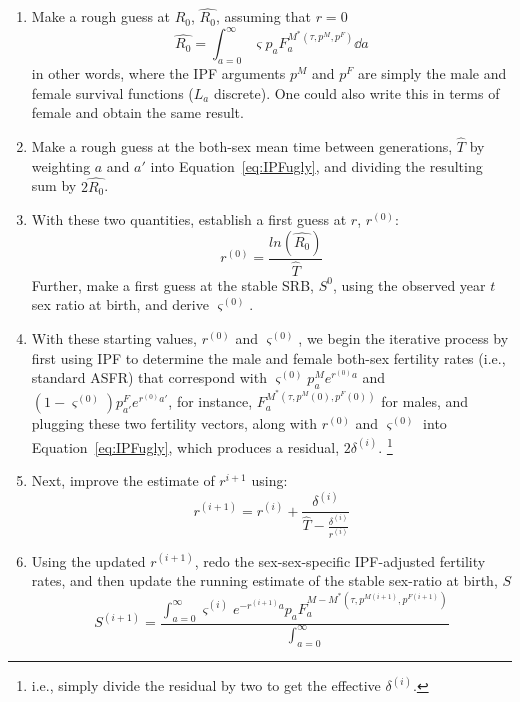 \begin{enumerate}
  \item Make a rough guess at $R_0$, $\widehat{R_0}$, assuming that $r = 0$
  \begin{equation}
  \widehat{R_0} = \int_{a=0}^\infty \varsigma p_aF_a^{M^\ast(\tau,p^{M},
  p^{F})} \dd a
  \end{equation}
  in other words, where the IPF arguments $p^{M}$ and $p^{F}$ are simply the
  male and female survival functions ($L_a$ discrete). One could also write this
  in terms of female and obtain the same result.
  \item Make a rough guess at the both-sex mean time between generations,
  $\widehat{T}$ by weighting $a$ and $a'$ into Equation~\eqref{eq:IPFugly},
  and dividing the resulting sum by $2\widehat{R_0}$.
  \item With these two quantities, establish a first guess at $r$,
  $r^{(0)}$:
  \begin{equation}
  r^{(0)} = \frac{ln(\widehat{R_0})}{\widehat{T}}
  \end{equation}
  Further, make a first guess at the stable SRB, $S^0$, using
  the observed year $t$ sex ratio at birth, and derive $\varsigma^{(0)}$.
  \item With these starting values, $r^{(0)}$ and $\varsigma^{(0)}$, we begin
  the iterative process by first using IPF to determine the male and female
  both-sex fertility rates (i.e., standard ASFR) that correspond with
  $\varsigma^{(0)} p_a^Me^{r^{(0)}a}$ and $(1-\varsigma^{(0)})p_{a'}^Fe^{r^{(0)}a'}$, for
  instance, $F_a^{M^\ast(\tau,p^{M}(0), p^{F}(0))}$ for males, and plugging
  these two fertility vectors, along with $r^{(0)}$ and $\varsigma^{(0)}$ into
  Equation~\eqref{eq:IPFugly}, which produces a residual, $2\delta^{(i)}$.
  \footnote{i.e., simply divide the residual by two to get the effective
  $\delta^{(i)}$.}
  \item Next, improve the estimate of $r^{i+1}$ using: 
  \begin{equation}
  r^{(i+1)} = r^{(i)} + \frac{\delta^{(i)}}{\widehat{T} -
\frac{\delta ^{(i)}}{r^{(i)} }}
  \end{equation}
  \item Using the updated $r^{(i+1)}$, redo the sex-sex-specific IPF-adjusted
  fertility rates, and then update the running estimate of the stable
  sex-ratio at birth, $S$
  \begin{equation}
  S^{(i+1)} = \frac{\int_{a=0}^\infty \varsigma^{(i)}
  e^{-r^{(i+1)}a}p_aF_a^{M-M^\ast(\tau,p^{M(i+1)}, p^{F(i+1)})}}{\int_{a=0}^\infty
}
\end{equation}
\end{enumerate}
